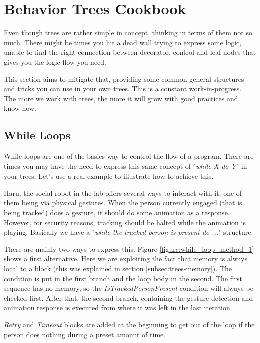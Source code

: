\documentclass[a4paper,12pt]{article}
\begin{document}
\clearpage
\section{Behavior Trees Cookbook}
\label{sec:behavior-trees-cookbook}

Even though trees are rather simple in concept, thinking in terms of them not so much. There might be times you hit a dead wall trying to express some logic, unable to find the right connection between decorator, control and leaf nodes that gives you the logic flow you need.

This section aims to mitigate that, providing some common general structures and tricks you can use in your own trees. This is a constant work-in-progress. The more we work with trees, the more it will grow with good practices and know-how.

\subsection{While Loops}
\label{subsec:cookbook-while-loop}

While loops are one of the basics way to control the flow of a program. There are times you may have the need to express this same concept of "\textit{while X do Y}" in your trees. Let's use a real example to illustrate how to achieve this.

Haru, the social robot in the lab offers several ways to interact with it, one of them being via physical gestures. When the person currently engaged (that is, being tracked) does a gesture, it should do some animation as a response. However, for security reasons, tracking should be halted while the animation is playing. Basically we have a "\textit{while the tracked person is present do ...}" structure.

There are mainly two ways to express this. Figure \ref{figure:while_loop_method_1} shows a first alternative. Here we are exploiting the fact that memory is always local to a block (this was explained in section \ref{subsec:trees-memory}). The condition is put in the first branch and the loop body in the second. The first sequence has no memory, so the \textit{IsTrackedPersonPresent} condition will always be checked first. After that, the second branch, containing the gesture detection and animation response is executed from where it was left in the last iteration.

\textit{Retry} and \textit{Timeout} blocks are added at the beginning to get out of the loop if the person does nothing during a preset amount of time.
\end{document}
